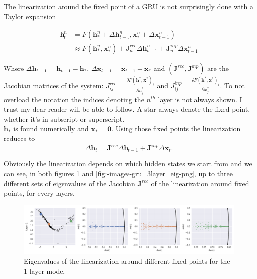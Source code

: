 \documentclass{article}
\begin{document}
The linearization around the fixed point of a GRU is not surprisingly done with a Taylor expansion

\begin{align}
  \textbf{h}_t^n &= F\left( \textbf{h}_*^n + \Delta \textbf{h}_{t-1}^n, \textbf{x}_*^n + \Delta \textbf{x}_{t-1}^n \right) \\
                 & \approx F\left( \textbf{h}_*^n, \textbf{x}_*^n \right) + \textbf{J}_n^{rec}\Delta \textbf{h}_{t-1}^n + \textbf{J}_n^{inp}\Delta \textbf{x}_{t-1}^n
\end{align}

Where $\Delta \textbf{h}_{t-1} = \textbf{h}_{t-1} - \textbf{h}_*$, $\Delta \textbf{x}_{t-1} = \textbf{x}_{t-1} - \textbf{x}_*$ and $\left(\textbf{J}^{rec}, \textbf{J}^{inp}\right)$ are the Jacobian matrices  of the system:  $J_{ij}^{rec}=\frac{\partial F\left( \textbf{h}^*, \textbf{x}^* \right)_i }{\partial h^*_j} $ and $J_{ij}^{inp}=\frac{\partial F\left( \textbf{h}^*, \textbf{x}^* \right)_i }{\partial x^*_j} $. To not overload the notation the indices denoting the $n^{th}$ layer is not always shown. I trust my dear reader will be able to follow. A star always denote the fixed point, whether it's in subscript or superscript.\\
$\textbf{h}_*$ is found numerically and  $\textbf{x}_*=\textbf{0}$. Using those fixed points the linearization reduces to
\[
  \Delta \textbf{h}_t = \textbf{J}^{rec} \Delta \textbf{h}_{t-1} + \textbf{J}^{inp}  \Delta \textbf{x}_{t}
.\] 

Obviously the linearization depends on which hidden states we start from and we can see, in both figures \ref{fig:-images-gru_1layer_eig-png} and \ref{fig:-images-gru_3layer_eig-png}, up to three different sets of eigenvalues of the Jacobian $\textbf{J}^{rec}$ of the linearization around fixed points, for every layers.

\begin{figure}[H]
  \centering
  \includegraphics[width=1\textwidth]{../images/gru_1layer_eig.png}
  \caption{Eigenvalues of the linearization around different fixed points for the 1-layer model}
  \label{fig:-images-gru_1layer_eig-png}
\end{figure}
\end{document}
